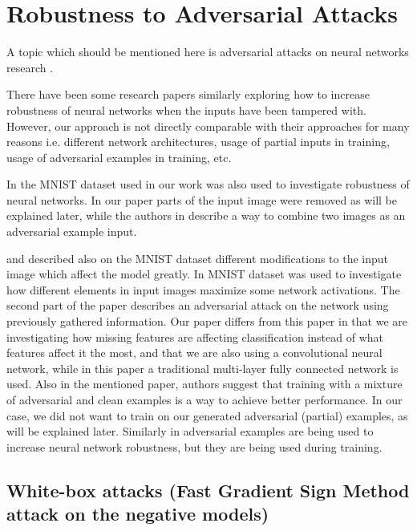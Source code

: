 \documentclass[b5paper]{book}
\let\cite\parencite
\begin{document}
\section{Robustness to Adversarial Attacks}

A topic which should be mentioned here is adversarial attacks on neural networks research \cite{bastani2016measuring}. 

There have been some research papers similarly exploring how to increase robustness of neural networks when the inputs have been tampered with. However, our approach is not directly comparable with their approaches for many reasons i.e. different network architectures, usage of partial inputs in training, usage of adversarial examples in training, etc.

In \cite{globerson2006nightmare} the MNIST \cite{lecun1998mnist} dataset used in our work was also used to investigate robustness of neural networks. In our paper parts of the input image were removed as will be explained later, while the authors in \cite{globerson2006nightmare} describe a way to combine two images as an adversarial example input.

\cite{szegedy2013intriguing} and \cite{goodfellowexplaining} described also on the MNIST dataset different modifications to the input image which affect the model greatly. In \cite{szegedy2013intriguing} MNIST dataset was used to investigate how different elements in input images maximize some network activations. The second part of the paper describes an adversarial attack on the network using previously gathered information. Our paper differs from this paper in that we are investigating how missing features are affecting classification instead of what features affect it the most, and that we are also using a convolutional neural network, while in this paper a traditional multi-layer fully connected network is used. Also in the mentioned paper, authors suggest that training with a mixture of adversarial and clean examples is a way to achieve better performance. In our case, we did not want to train on our generated adversarial (partial) examples, as will be explained later. Similarly in \cite{goodfellowexplaining} adversarial examples are being used to increase neural network robustness, but they are being used during training. 

\subsection{White-box attacks (Fast Gradient Sign Method attack on the negative models)}
\end{document}
